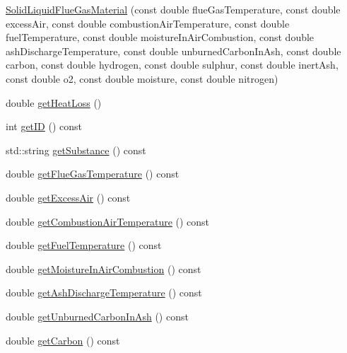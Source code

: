 \begin{DoxyCompactItemize}
\hyperlink{class_solid_liquid_flue_gas_material_a91e7c5e670b3db4fedcbc494448644d5}{Solid\+Liquid\+Flue\+Gas\+Material} (const double flue\+Gas\+Temperature, const double excess\+Air, const double combustion\+Air\+Temperature, const double fuel\+Temperature, const double moisture\+In\+Air\+Combustion, const double ash\+Discharge\+Temperature, const double unburned\+Carbon\+In\+Ash, const double carbon, const double hydrogen, const double sulphur, const double inert\+Ash, const double o2, const double moisture, const double nitrogen)
\item 
double \hyperlink{class_solid_liquid_flue_gas_material_af7d36673e49f9b5eb631fc04227883d6}{get\+Heat\+Loss} ()
\item 
int \hyperlink{class_solid_liquid_flue_gas_material_afb124b546137da7ba99e31616198e0c8}{get\+ID} () const
\item 
std\+::string \hyperlink{class_solid_liquid_flue_gas_material_a6e07a23fb05c15c7e5dba39334988de8}{get\+Substance} () const
\item 
double \hyperlink{class_solid_liquid_flue_gas_material_aba4604158b3c624496d7de4b5fb511e2}{get\+Flue\+Gas\+Temperature} () const
\item 
double \hyperlink{class_solid_liquid_flue_gas_material_a49e7bb4ebc45897c81b6f38610ceaf02}{get\+Excess\+Air} () const
\item 
double \hyperlink{class_solid_liquid_flue_gas_material_a8757b831e5a2ef26dbb0cf271c0e8207}{get\+Combustion\+Air\+Temperature} () const
\item 
double \hyperlink{class_solid_liquid_flue_gas_material_a629ecc7104b6bfbb696d9478c4b48e7a}{get\+Fuel\+Temperature} () const
\item 
double \hyperlink{class_solid_liquid_flue_gas_material_ae3d9780851b8217ed2885753f11ec18b}{get\+Moisture\+In\+Air\+Combustion} () const
\item 
double \hyperlink{class_solid_liquid_flue_gas_material_ab233d4e27397cc74fbe2d3084e4e6f7c}{get\+Ash\+Discharge\+Temperature} () const
\item 
double \hyperlink{class_solid_liquid_flue_gas_material_a53ac34a949168a35297ab3afb9eb2c7b}{get\+Unburned\+Carbon\+In\+Ash} () const
\item 
double \hyperlink{class_solid_liquid_flue_gas_material_a7b8a98111943d30094e2d6950f7f2ec1}{get\+Carbon} () const
\item 
\mbox{\label{class_solid_liquid_flue_gas_material_ab89eddf949fefcc1ade049233c2dc12b}} 

\end{DoxyCompactItemize}
